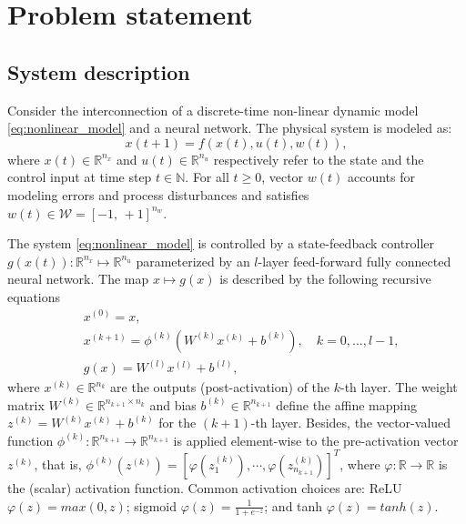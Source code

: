 \documentclass[journal]{IEEEtran}
\begin{document}

\section{Problem statement} \label{sec:statement}


\subsection{System description} \label{sec:NNCSS}

Consider the  interconnection of a discrete-time non-linear dynamic model \eqref{eq:nonlinear_model} and a neural network. The physical system is modeled as:
\begin{equation}\label{eq:nonlinear_model}
    x(t+1) = f(x(t),u(t),w(t)),
\end{equation}
\noindent where $x(t) \in \mathbb{R}^{n_x}$ and $u(t) \in \mathbb{R}^{n_u}$ respectively refer to the state and the control input at time step $t \in \mathbb{N}$. For all $t\geq 0$,  vector $w(t)$   accounts for modeling errors and process disturbances and satisfies $w(t) \in \mathcal{W} = [-1, \, +1]^{n_w}$.

The system \eqref{eq:nonlinear_model} is controlled by a  state-feedback controller $g(x(t)) : \mathbb{R}^{n_x} \mapsto \mathbb{R}^{n_u}$ parameterized by an $l$-layer feed-forward fully connected neural network. The map $x \mapsto g(x)$ is described by the following recursive equations
\begin{equation} \label{eq:NN_model}
    \begin{aligned}
    &x^{(0)}  = x,\\
    &x^{(k+1)} = \phi^{(k)}(W^{(k)}x^{(k)} + b^{(k)}), \quad   k  = 0,...,l-1,\\
    & g(x) = W^{(l)}x^{(l)} + b^{(l)},
    \end{aligned}
\end{equation}
\noindent where  $x^{(k)}\in \mathbb{R}^{n_k} $ are the outputs (post-activation) of the $k$-th layer. The weight matrix $W^{(k)} \in \mathbb{R}^{n_{k+1}\times n_k}$ and bias $b^{(k)} \in \mathbb{R}^{n_{k+1}}$ define the affine mapping $z^{(k)} = W^{(k)}x^{(k)} + b^{(k)}$  for the $(k+1)$-th layer. Besides, the vector-valued function  $\phi^{(k)}: \mathbb{R}^{n_{k+1}} \to \mathbb{R}^{n_{k+1}}$ is applied element-wise to the pre-activation vector $z^{(k)}$, that is, 
$  \phi^{(k)}(z^{(k)}) =
    [
    \varphi(z^{(k)}_1), \cdots, \varphi(z^{(k)}_{n_{k+1}}) ]^T$, 
where $\varphi: \mathbb{R} \to \mathbb{R}$ is the (scalar) activation function.  Common activation choices are:  ReLU  $\varphi(z) = max(0,z)$; sigmoid $\varphi(z) = \frac{1}{1+e^{-z}}$; and tanh $\varphi(z) = tanh(z)$. 
\end{document}
